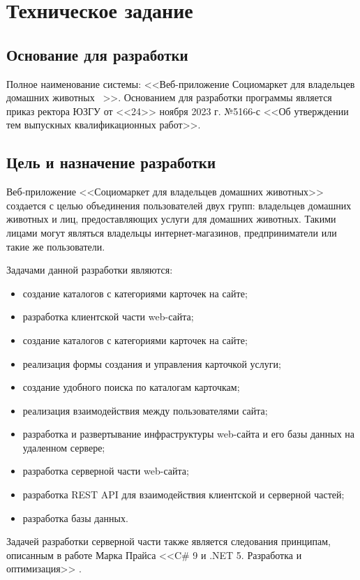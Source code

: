 \section{Техническое задание}
\subsection{Основание для разработки}

Полное наименование системы: <<Веб-приложение \textquotedbl Социомаркет для владельцев домашних животных \textquotedbl\ >>.
Основанием для разработки программы является приказ ректора ЮЗГУ от <<24>> ноября 2023 г. №5166-с <<Об утверждении тем выпускных квалификационных работ>>.

\subsection{Цель и назначение разработки}

Веб-приложение <<Социомаркет для владельцев домашних животных>> создается с целью объединения пользователей двух групп: владельцев домашних животных и лиц, предоставляющих услуги для домашних животных. Такими лицами могут являться владельцы интернет-магазинов, предприниматели или такие же пользователи.

Задачами данной разработки являются:
\begin{itemize}
\item создание каталогов с категориями карточек на сайте;
\item разработка клиентской части web-сайта;
\item создание каталогов с категориями карточек на сайте;
\item реализация формы создания и управления карточкой услуги;
\item создание удобного поиска по каталогам карточкам;
\item реализация взаимодействия между пользователями сайта;
\item разработка и развертывание инфраструктуры web-сайта и его базы данных на удаленном сервере;
\item разработка серверной части web-сайта;
\item разработка REST API для взаимодействия клиентской и серверной частей;
\item разработка базы данных.
\end{itemize}

Задачей разработки серверной части также является следования принципам, описанным в работе Марка Прайса <<C\# 9 и .NET 5. Разработка и оптимизация>> \cite{mark_price}.

